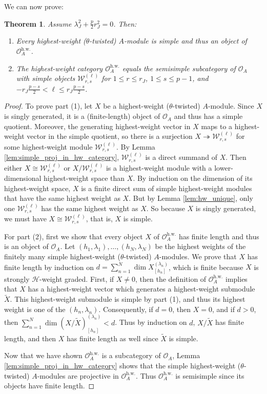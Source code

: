 \documentclass[11pt, reqno]{amsart}
\newtheorem{thm}{Theorem}[section]
\theoremstyle{definition}\newtheorem{defi}[thm]{Definition}
\theoremstyle{definition}\newtheorem{rem}[thm]{Remark}
\theoremstyle{definition}\newtheorem{exam}[thm]{Example}
\theoremstyle{definition}\newtheorem{assum}[thm]{Assumption}
\newcommand{\cH}{\mathcal{H}}
\newcommand{\cO}{\mathcal{O}}
\newcommand{\cW}{\mathcal{W}}
\newcommand{\til}{\widetilde}
\begin{document}
We can now prove:
\begin{thm}\label{thm:hw_cat_ss}
Assume $\lambda_J^2+\frac{p}{2}r_J^2=0$. Then:
\begin{enumerate}
\item Every highest-weight ($\theta$-twisted) $A$-module is simple and thus an object of $\cO_A^{\mathrm{h.w.}}$.
\item The highest-weight category $\cO_A^{\mathrm{h.w.}}$ equals the semisimple subcategory of $\cO_A$ with simple objects $\cW_{r,s}^{(\ell)}$ for $1\leq r \leq r_J$, $1\leq s\leq p-1$, and $-r_J\frac{p-s}{2}<\ell\leq r_J\frac{p-s}{2}$.
\end{enumerate}
\end{thm}
\begin{proof}
To prove part (1), let $X$ be a highest-weight ($\theta$-twisted) $A$-module. Since $X$ is singly generated, it is a (finite-length) object of $\cO_A$ and thus has a simple quotient. Moreover, the generating highest-weight vector in $X$ maps to a highest-weight vector in the simple quotient, so there is a surjection $X\twoheadrightarrow\cW_{r,s}^{(\ell)}$ for some highest-weight module $\cW_{r,s}^{(\ell)}$. By Lemma \ref{lem:simple_proj_in_hw_category}, $\cW_{r,s}^{(\ell)}$ is a direct summand of $X$. Then either $X\cong\cW_{r,s}^{(\ell)}$ or $X/\cW_{r,s}^{(\ell)}$ is a highest-weight module with a lower-dimensional highest-weight space than $X$. By induction on the dimension of its highest-weight space, $X$ is a finite direct sum of simple highest-weight modules that have the same highest weight as $X$. But by Lemma \ref{lem:hw_unique}, only one $\cW_{r,s}^{(\ell)}$ has the same highest weight as $X$. So because $X$ is singly generated, we must have $X\cong\cW_{r,s}^{(\ell)}$, that is, $X$ is simple.

For part (2), first we show that every object $X$ of $\cO_A^{\mathrm{h.w.}}$ has finite length and thus is an object of $\cO_A$. Let $(h_1,\lambda_1),\ldots, (h_N,\lambda_N)$ be the highest weights of the finitely many simple highest-weight ($\theta$-twisted) $A$-modules. We prove that $X$ has finite length by induction on $d=\sum_{n=1}^N \dim X_{[h_n]}^{(\lambda_n)}$, which is finite because $X$ is strongly $\cH$-weight graded. First, if $X\neq 0$, then the definition of $\cO_A^{\mathrm{h.w.}}$ implies that $X$ has a highest-weight vector which generates a highest-weight submodule $\til{X}$. This highest-weight submodule is simple by part (1), and thus its highest weight is one of the $(h_n,\lambda_n)$. Consequently, if $d=0$, then $X=0$, and if $d>0$, then $\sum_{n=1}^N \dim  (X/\til{X})^{(\lambda_n)}_{[h_n]} < d$. Thus by induction on $d$, $X/\til{X}$ has finite length, and then $X$ has finite length as well since $\til{X}$ is simple.

Now that we have shown $\cO_A^{\mathrm{h.w.}}$ is a subcategory of $\cO_A$, Lemma \ref{lem:simple_proj_in_hw_category} shows that the simple highest-weight ($\theta$-twisted) $A$-modules are projective in $\cO_A^{\mathrm{h.w.}}$. Thus $\cO_A^{\mathrm{h.w.}}$ is semisimple since its objects have finite length.
\end{proof}
\end{document}
